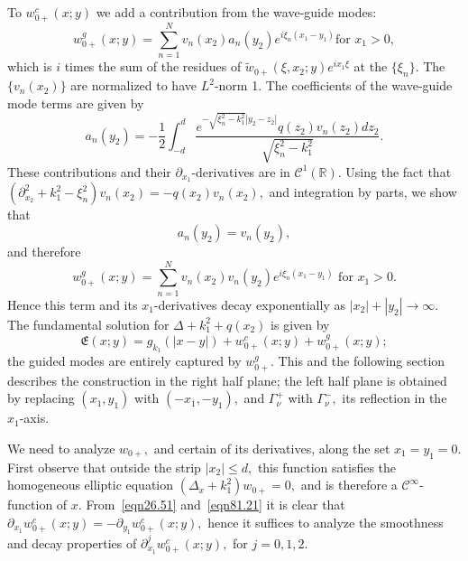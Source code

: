 \documentclass[11pt]{article}
\newcommand\fE{\mathfrak E}
\newcommand\cC{\mathcal{C}}
\newcommand\tw{\tilde w_{0+}}
\newcommand\bbR{\mathbb R}
\newcommand\pa{\partial}
\theoremstyle{definition}
\theoremstyle{remark}
\begin{document}
To $w^c_{0+}(x;y)$ we add a contribution from the wave-guide modes:
\begin{equation}\label{eqn43.34.1}
  w^g_{0+}(x;y)=\sum_{n=1}^Nv_n(x_2)a_n(y_2)e^{i\xi_n(x_1-y_1)}
    \text{
      for }x_1>0,
\end{equation}
which is $i$ times the sum of the residues of $\tw(\xi,x_2;y)e^{ix_1\xi}$ at the
$\{\xi_n\}.$ The $\{v_n(x_2)\}$ are normalized to have $L^2$-norm 1. The
coefficients of the wave-guide mode terms are given by
\begin{equation}
  a_n(y_2)=-\frac{1}{2}\int_{-d}^{d}\frac{e^{-\sqrt{\xi_n^2-k_1^2}|y_2-z_2|}q(z_2)v_n(z_2)dz_2}{\sqrt{\xi_n^2-k_1^2}}.
\end{equation}
These contributions and their $\pa_{x_1}$-derivatives are in
$\cC^1(\bbR).$  Using the fact that
$(\pa_{x_2}^2+k_1^2-\xi_n^2)v_n(x_2)=-q(x_2)v_n(x_2),$ and integration by parts,
we show that
\begin{equation}
  a_n(y_2)=v_n(y_2),
\end{equation}
and therefore
\begin{equation}\label{eqn43.34}
  w^g_{0+}(x;y)=\sum_{n=1}^Nv_n(x_2)v_n(y_2)e^{i\xi_n(x_1-y_1)}
    \text{ for }x_1>0.
\end{equation}
Hence this term and its $x_1$-derivatives decay exponentially as
$|x_2|+|y_2|\to\infty.$ The fundamental solution for $\Delta+k_1^2+q(x_2)$ is
given by
\begin{equation}\label{eqn35.91}
  \fE(x;y)=g_{k_1}(|x-y|)+w_{0+}^{c}(x;y)+w_{0+}^{g}(x;y);
\end{equation}
the guided modes are entirely captured by $w^g_{0+}.$ This and the following
section describes the construction in the right half plane; the left half plane
is obtained by replacing $(x_1,y_1)$ with $(-x_1,-y_1),$ and $\Gamma_{\nu}^+$
with $\Gamma_{\nu}^-,$ its reflection in the $x_1$-axis.

We need to analyze $w_{0+},$ and certain of its derivatives,
along the set $x_1=y_1=0.$ First observe that outside the strip
$|x_2|\leq d,$ this function satisfies the homogeneous elliptic
equation $(\Delta_x+k_1^2)w_{0+}=0,$ and is therefore a
$\cC^{\infty}$-function of $x.$ From~\eqref{eqn26.51} and~\eqref{eqn81.21}  it is
clear that
$\pa_{x_1}w^c_{0+}(x;y)=-\pa_{y_1}w^c_{0+}(x;y),$ hence it suffices to
analyze the smoothness and decay properties of
$\pa_{x_1}^jw^c_{0+}(x;y),$ for $j=0,1,2.$
\end{document}
